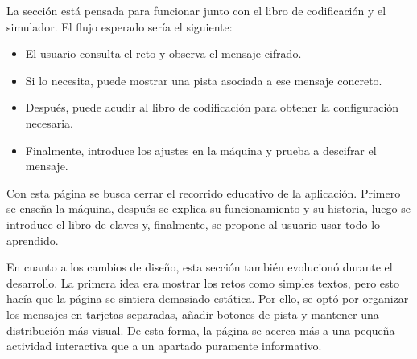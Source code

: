 La sección está pensada para funcionar junto con el libro de codificación y el simulador. El flujo esperado sería el siguiente:

\begin{itemize}
	\item El usuario consulta el reto y observa el mensaje cifrado.
	\item Si lo necesita, puede mostrar una pista asociada a ese mensaje concreto.
	\item Después, puede acudir al libro de codificación para obtener la configuración necesaria.
	\item Finalmente, introduce los ajustes en la máquina y prueba a descifrar el mensaje.
\end{itemize}

Con esta página se busca cerrar el recorrido educativo de la aplicación. Primero se enseña la máquina, después se explica su funcionamiento y su historia, luego se introduce el libro de claves \cite{operation_turing_codebook} y, finalmente, se propone al usuario usar todo lo aprendido.

En cuanto a los cambios de diseño, esta sección también evolucionó durante el desarrollo. La primera idea era mostrar los retos como simples textos, pero esto hacía que la página se sintiera demasiado estática. Por ello, se optó por organizar los mensajes en tarjetas separadas, añadir botones de pista y mantener una distribución más visual. De esta forma, la página se acerca más a una pequeña actividad interactiva que a un apartado puramente informativo.






